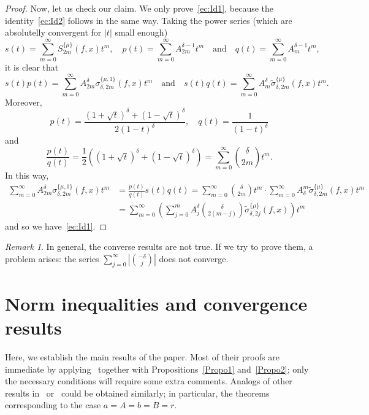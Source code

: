 \documentclass{amsart}
\theoremstyle{plain}
\theoremstyle{definition}
\theoremstyle{remark}
\newtheorem{Rem}{Remark}
\newcommand{\chem}[3]{\sigma_{#1,#2}^{\{#3\}}} %
\newcommand{\chemmod}[3]{\widetilde{\sigma}_{#1,#2}^{\{#3\}}} %
\newcommand{\fouhe}[2]{S_{#1}^{\{#2\}}} %
\newcommand{\combi}[2]{A_{#1}^{#2}}
\newcommand{\I}{\infty}
\begin{document}
\begin{proof}
Now, let us check our claim. We only prove~\eqref{ec:Id1},
because the identity~\eqref{ec:Id2} follows in the same way.
Taking the power series (which are absolutelly convergent for $|t|$ small enough)
\[
  s(t) = \sum_{m=0}^\I \fouhe{2m}{\mu}(f,x)t^m,\quad p(t)
  = \sum_{m=0}^\I \combi{2m}{\delta-1}t^m\quad
  \text{and}\quad
  q(t) = \sum_{m=0}^\I \combi{m}{\delta-1}t^m,
\]
it is clear that
\[
  s(t)p(t) = \sum_{m=0}^\I \combi{2m}{\delta} \chem{\delta}{2m}{\mu,1}(f,x)t^m
  \quad\text{and}\quad
  s(t)q(t) = \sum_{m=0}^\I \combi{m}{\delta} \chemmod{\delta}{2m}{\mu}(f,x)t^m.
\]
Moreover,
\[
  p(t) = \frac{(1+\sqrt{t})^{\delta}+(1-\sqrt{t})^{\delta}}{2(1-t)^\delta},
  \quad q(t) = \frac{1}{(1-t)^\delta}
\]
and
\[
  \frac{p(t)}{q(t)} = \frac12((1+\sqrt{t})^\delta + (1-\sqrt{t})^\delta)
  = \sum_{m=0}^\I \binom{\delta}{2m}t^m.
\]
In this way,
\begin{align*}
  \sum_{m=0}^\I \combi{2m}{\delta} \chem{\delta}{2m}{\mu,1}(f,x)t^m
  &= \frac{p(t)}{q(t)}s(t)q(t)
  = \sum_{m=0}^\I \binom{\delta}{2m}t^m
    \cdot \sum_{m=0}^\I \combi{\delta}{m} \chemmod{\delta}{2m}{\mu}(f,x)t^m \\
  &= \sum_{m=0}^\I \left(\sum_{j=0}^m \combi{j}{\delta}\binom{\delta}{2(m-j)}
    \chemmod{\delta}{2j}{\mu}(f,x)\right)t^m
\end{align*}
and so we have~\eqref{ec:Id1}.
\end{proof}

\begin{Rem}
\label{sst}
In general, the converse results are not true. If we try to prove them,
a problem arises: the series $\sum_{j=0}^\I |\binom{-\delta}{j}|$ does not converge.
\end{Rem}


\section{Norm inequalities and convergence results}

Here, we establish the main results of the paper.
Most of their proofs are immediate by applying~\cite{MW} together
with Propositions~\ref{Propo1} and~\ref{Propo2}; only the necessary conditions will require some extra comments.
Analogs of other results in~\cite{MW} or~\cite{MW2} could be obtained similarly;
in particular, the theorems corresponding to the case $a=A=b=B=r$.
\end{document}
